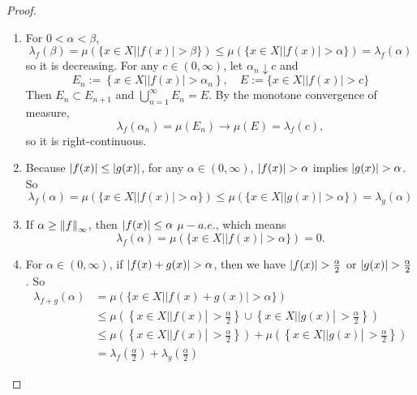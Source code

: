 \begin{proof}
	\begin{enumerate}[label=(\arabic{*})]
		\item For $0 < \alpha < \beta$,
		\begin{equation*}
			\lambda_f(\beta)=\mu(\{x \in X| | f(x) \mid>\beta\}) \leq \mu(\{x \in X| | f(x) \mid>\alpha\})=\lambda_f(\alpha)
		\end{equation*}
		so it is decreasing. For any $c \in (0, \infty)$, let $\alpha_n \downarrow c$ and
		\begin{equation*}
			E_n:=\left\{x \in X| | f(x) \mid>\alpha_n\right\}, \quad E:=\{x \in X| | f(x) \mid>c\}
		\end{equation*}
		Then $E_n \subset E_{n+1}$ and $\bigcup_{n=1}^{\infty} E_n=E$. By the monotone convergence of measure,
		\begin{equation*}
			\lambda_f\left(\alpha_n\right)=\mu\left(E_n\right) \longrightarrow \mu(E)=\lambda_f(c),
		\end{equation*}
		so it is right-continuous.

		\item Because $\left\lvert f(x)\right\lvert \leq \left\lvert g(x)\right\lvert$, for any $\alpha \in (0,\infty)$, $\left\lvert f(x)\right\lvert > \alpha$ implies $\left\lvert g(x)\right\lvert > \alpha$. So
		\begin{equation*}
			\lambda_f(\alpha)=\mu(\{x \in X| | f(x) \mid>\alpha\}) \leq \mu(\{x \in X| | g(x) \mid>\alpha\})=\lambda_g(\alpha)
		\end{equation*}

		\item If $\alpha \geq \left\lVert f\right\lVert_\infty$, then $\left\lvert f(x)\right\lvert \leq \alpha$ $\mu-a.e.$, which means
		\begin{equation*}
			\lambda_f(\alpha)=\mu(\{x \in X| | f(x) \mid>\alpha\})=0 .
		\end{equation*}

		\item For $\alpha \in (0,\infty)$, if $\left\lvert f(x) + g(x)\right\lvert > \alpha$, then we have $\left\lvert f(x)\right\lvert > \frac{\alpha}{2}$ or $\left\lvert g(x)\right\lvert > \frac{\alpha}{2}$. So
		\begin{equation*}
			\begin{aligned}
				\lambda_{f+g}(\alpha) & =\mu(\{x \in X| | f(x)+g(x) \mid>\alpha\}) \\
				& \leq \mu\left(\left\{x \in X| | f(x) \left\lvert\,>\frac{\alpha}{2}\right.\right\} \cup\left\{x \in X| | g(x) \left\lvert\,>\frac{\alpha}{2}\right.\right\}\right) \\
				& \leq \mu\left(\left\{x \in X| | f(x) \left\lvert\,>\frac{\alpha}{2}\right.\right\}\right)+\mu\left(\left\{x \in X| | g(x) \left\lvert\,>\frac{\alpha}{2}\right.\right\}\right) \\
				& =\lambda_f\left(\frac{\alpha}{2}\right)+\lambda_g\left(\frac{\alpha}{2}\right)
			\end{aligned}
		\end{equation*}
	\end{enumerate}
\end{proof}

